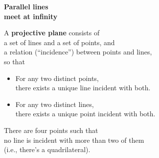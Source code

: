\documentclass[14pt]{chalkfjord}
\newcommand{\setbackgroundpicture}[1]{%
\usebackgroundtemplate{
\begin{pgfpicture}{0in}{0in}{\paperwidth}{\paperheight}
\pgfputat{\pgfxy(0,0)}{\texttt{[image: \#1]}}
\color{white}
\end{pgfpicture}
}
}
\newcommand{\clearbackgroundpicture}{\usebackgroundtemplate{}}
\begin{document}

\setbackgroundpicture{Railroad-Tracks-Perspective.jpg}
\begin{frame}
  \pause
  \vfill
  \vspace{0.5in}
  \color{white}\Large
  \begin{center}
  \textbf{Parallel lines} \\
  \textbf{meet at infinity}
  \end{center}
\end{frame}
\clearbackgroundpicture

\begin{frame}
  \begin{definition}
   A \textbf{projective plane} consists of \\
   \quad a set of lines and a set of points, and \\
   \quad a relation (``incidence'') between points and lines, \\
   so that
   \begin{itemize}
   \item For any two distinct points, \\
     there exists a unique line incident with both.
   \item For any two distinct lines, \\
     there exists a unique point incident with both.
   \end{itemize}
  \end{definition}

  \pause

  There are four points such that \\
  \quad no line is incident with more than two of them \\
  \pause\quad (i.e., there's a quadrilateral).

\end{frame}
\end{document}
